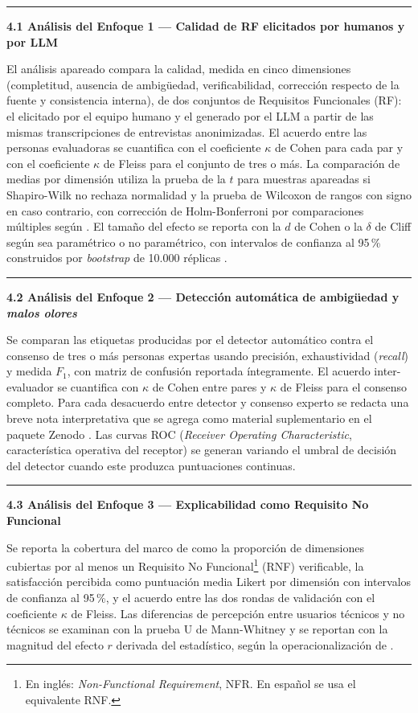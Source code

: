 \documentclass[11pt,a4paper]{article}
\newcommand{\submark}[1]{\par\vspace{4pt}\noindent
    {\color{uteqgreen}\rule[-1pt]{3.5pt}{12pt}}\hspace{6pt}\textbf{\color{uteqgreen}#1}\par\vspace{2pt}}
\begin{document}
\submark{4.1 Análisis del Enfoque 1 --- Calidad de RF elicitados por humanos y por LLM}
El análisis apareado compara la calidad, medida en cinco dimensiones (completitud, ausencia de ambigüedad, verificabilidad, corrección respecto de la fuente y consistencia interna), de dos conjuntos de Requisitos Funcionales (RF): el elicitado por el equipo humano y el generado por el LLM a partir de las mismas transcripciones de entrevistas anonimizadas.
El acuerdo entre las personas evaluadoras se cuantifica con el coeficiente $\kappa$ de Cohen \cite{cohen1960kappa} para cada par y con el coeficiente $\kappa$ de Fleiss \cite{fleiss1971kappa} para el conjunto de tres o más.
La comparación de medias por dimensión utiliza la prueba de la $t$ para muestras apareadas si Shapiro-Wilk no rechaza normalidad y la prueba de Wilcoxon de rangos con signo en caso contrario, con corrección de Holm-Bonferroni por comparaciones múltiples según \cite{holm1979correction}.
El tamaño del efecto se reporta con la $d$ de Cohen o la $\delta$ de Cliff según sea paramétrico o no paramétrico, con intervalos de confianza al 95\,\% construidos por \emph{bootstrap} de 10.000 réplicas \cite{efron1994bootstrap}.

\submark{4.2 Análisis del Enfoque 2 --- Detección automática de ambigüedad y \emph{malos olores}}
Se comparan las etiquetas producidas por el detector automático contra el consenso de tres o más personas expertas usando precisión, exhaustividad (\emph{recall}) y medida $F_1$, con matriz de confusión reportada íntegramente.
El acuerdo inter-evaluador se cuantifica con $\kappa$ de Cohen entre pares y $\kappa$ de Fleiss para el consenso completo.
Para cada desacuerdo entre detector y consenso experto se redacta una breve nota interpretativa que se agrega como material suplementario en el paquete Zenodo \cite{ferrari2018detecting,fischbach2023automatic}.
Las curvas ROC (\emph{Receiver Operating Characteristic}, característica operativa del receptor) se generan variando el umbral de decisión del detector cuando este produzca puntuaciones continuas.

\submark{4.3 Análisis del Enfoque 3 --- Explicabilidad como Requisito No Funcional}
Se reporta la cobertura del marco de \cite{chazette2021exploring} como la proporción de dimensiones cubiertas por al menos un Requisito No Funcional\footnote{En inglés: \emph{Non-Functional Requirement}, NFR. En español se usa el equivalente RNF.} (RNF) verificable, la satisfacción percibida como puntuación media Likert por dimensión con intervalos de confianza al 95\,\%, y el acuerdo entre las dos rondas de validación con el coeficiente $\kappa$ de Fleiss.
Las diferencias de percepción entre usuarios técnicos y no técnicos se examinan con la prueba U de Mann-Whitney y se reportan con la magnitud del efecto $r$ derivada del estadístico, según la operacionalización de \cite{chazette2022explainable}.
\end{document}
